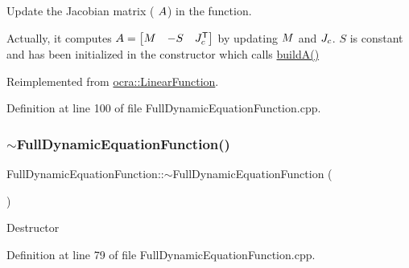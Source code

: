 Update the Jacobian matrix ( $ A $) in the function.

Actually, it computes $ A = \begin{bmatrix} M & -S & J_c^{\mathsf{T}} \end{bmatrix} $ by updating $ M $ and $ J_c $. $ S $ is constant and has been initialized in the constructor which calls \hyperlink{group__constraint_ga19d9bbe4f78b4c396930388a70b8cd4b}{build\+A()} 

Reimplemented from \hyperlink{classocra_1_1LinearFunction_a30926f977c0124a0b0f65b854ab39636}{ocra\+::\+Linear\+Function}.



Definition at line 100 of file Full\+Dynamic\+Equation\+Function.\+cpp.

\hypertarget{group__constraint_gab3c2d35bef3c4d8733b7ab0e9ff48bfc}{}\label{group__constraint_gab3c2d35bef3c4d8733b7ab0e9ff48bfc} 
\subsubsection{\texorpdfstring{$\sim$\+Full\+Dynamic\+Equation\+Function()}{~FullDynamicEquationFunction()}}
{\footnotesize\ttfamily Full\+Dynamic\+Equation\+Function\+::$\sim$\+Full\+Dynamic\+Equation\+Function (\begin{DoxyParamCaption}{ }\end{DoxyParamCaption})}

Destructor 

Definition at line 79 of file Full\+Dynamic\+Equation\+Function.\+cpp.

